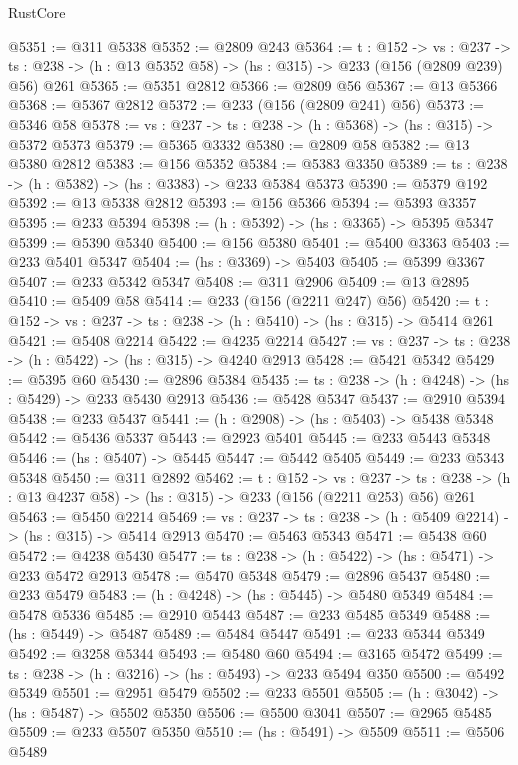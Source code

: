 \begin{lexlean}{RustCore}
\begin{coremodule}
@5351 := @311 @5338
@5352 := @2809 @243
@5364 := {t : @152} ->
  {vs : @237} ->
  {ts : @238} -> (h : @13 @5352 @58) -> (hs : @315) -> @233 (@156 (@2809 @239) @56) @261
@5365 := @5351 @2812
@5366 := @2809 @56
@5367 := @13 @5366
@5368 := @5367 @2812
@5372 := @233 (@156 (@2809 @241) @56)
@5373 := @5346 @58
@5378 := {vs : @237} -> {ts : @238} -> (h : @5368) -> (hs : @315) -> @5372 @5373
@5379 := @5365 @3332
@5380 := @2809 @58
@5382 := @13 @5380 @2812
@5383 := @156 @5352
@5384 := @5383 @3350
@5389 := {ts : @238} -> (h : @5382) -> (hs : @3383) -> @233 @5384 @5373
@5390 := @5379 @192
@5392 := @13 @5338 @2812
@5393 := @156 @5366
@5394 := @5393 @3357
@5395 := @233 @5394
@5398 := (h : @5392) -> (hs : @3365) -> @5395 @5347
@5399 := @5390 @5340
@5400 := @156 @5380
@5401 := @5400 @3363
@5403 := @233 @5401 @5347
@5404 := (hs : @3369) -> @5403
@5405 := @5399 @3367
@5407 := @233 @5342 @5347
@5408 := @311 @2906
@5409 := @13 @2895
@5410 := @5409 @58
@5414 := @233 (@156 (@2211 @247) @56)
@5420 := {t : @152} -> {vs : @237} -> {ts : @238} -> (h : @5410) -> (hs : @315) -> @5414 @261
@5421 := @5408 @2214
@5422 := @4235 @2214
@5427 := {vs : @237} -> {ts : @238} -> (h : @5422) -> (hs : @315) -> @4240 @2913
@5428 := @5421 @5342
@5429 := @5395 @60
@5430 := @2896 @5384
@5435 := {ts : @238} -> (h : @4248) -> (hs : @5429) -> @233 @5430 @2913
@5436 := @5428 @5347
@5437 := @2910 @5394
@5438 := @233 @5437
@5441 := (h : @2908) -> (hs : @5403) -> @5438 @5348
@5442 := @5436 @5337
@5443 := @2923 @5401
@5445 := @233 @5443 @5348
@5446 := (hs : @5407) -> @5445
@5447 := @5442 @5405
@5449 := @233 @5343 @5348
@5450 := @311 @2892
@5462 := {t : @152} ->
  {vs : @237} ->
  {ts : @238} -> (h : @13 @4237 @58) -> (hs : @315) -> @233 (@156 (@2211 @253) @56) @261
@5463 := @5450 @2214
@5469 := {vs : @237} -> {ts : @238} -> (h : @5409 @2214) -> (hs : @315) -> @5414 @2913
@5470 := @5463 @5343
@5471 := @5438 @60
@5472 := @4238 @5430
@5477 := {ts : @238} -> (h : @5422) -> (hs : @5471) -> @233 @5472 @2913
@5478 := @5470 @5348
@5479 := @2896 @5437
@5480 := @233 @5479
@5483 := (h : @4248) -> (hs : @5445) -> @5480 @5349
@5484 := @5478 @5336
@5485 := @2910 @5443
@5487 := @233 @5485 @5349
@5488 := (hs : @5449) -> @5487
@5489 := @5484 @5447
@5491 := @233 @5344 @5349
@5492 := @3258 @5344
@5493 := @5480 @60
@5494 := @3165 @5472
@5499 := {ts : @238} -> (h : @3216) -> (hs : @5493) -> @233 @5494 @350
@5500 := @5492 @5349
@5501 := @2951 @5479
@5502 := @233 @5501
@5505 := (h : @3042) -> (hs : @5487) -> @5502 @5350
@5506 := @5500 @3041
@5507 := @2965 @5485
@5509 := @233 @5507 @5350
@5510 := (hs : @5491) -> @5509
@5511 := @5506 @5489

\end{coremodule}
\end{lexlean}
